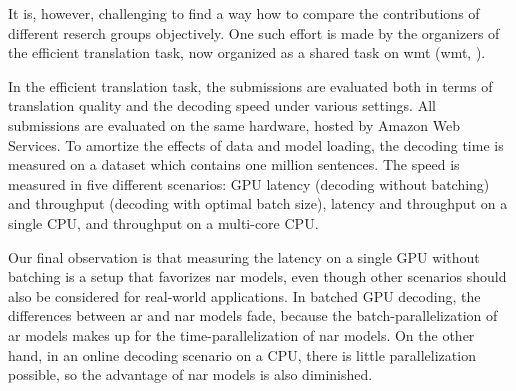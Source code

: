 It is, however, challenging to find a way how to compare the contributions of
different reserch groups objectively. One such effort is made by the organizers
of the efficient translation task, now organized as a shared task on \acl{wmt}
(\acs{wmt}, \citealp{heafield-etal-2020-findings,
  heafield-etal-2021-findings}).

In the efficient translation task, the submissions are evaluated both in terms
of translation quality and the decoding speed under various settings. All
submissions are evaluated on the same hardware, hosted by Amazon Web Services.
To amortize the effects of data and model loading, the decoding time is
measured on a dataset which contains one million sentences. The speed is
measured in five different scenarios: GPU latency (decoding without batching)
and throughput (decoding with optimal batch size), latency and throughput on a
single CPU, and throughput on a multi-core CPU.



Our final observation is that measuring the latency on a single GPU without
batching is a setup that favorizes \ac{nar} models, even though other scenarios
should also be considered for real-world applications. In batched GPU decoding,
the differences between \ac{ar} and \ac{nar} models fade, because the
batch-parallelization of \ac{ar} models makes up for the time-parallelization
of \ac{nar} models. On the other hand, in an online decoding scenario on a CPU,
there is little parallelization possible, so the advantage of \ac{nar} models
is also diminished.









